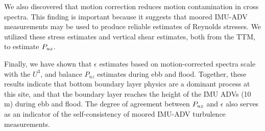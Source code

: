 We also discovered that motion correction reduces motion contamination in cross spectra. This finding is important because it suggests that moored IMU-ADV measurements may be used to produce reliable estimates of Reynolds stresses. We utilized these stress estimates and vertical shear estimates, both from the TTM, to estimate $P_{uz}$. 

Finally, we have shown that $\epsilon$ estimates based on motion-corrected spectra scale with the $U^3$, and balance $P_{uz}$ estimates during ebb and flood. Together, these results indicate that bottom boundary layer physics are a dominant process at this site, and that the boundary layer reaches the height of the IMU ADVs (10 m) during ebb and flood. The degree of agreement between $P_{uz}$ and $\epsilon$ also serves as an indicator of the self-consistency of moored IMU-ADV turbulence measurements. 

%


%



